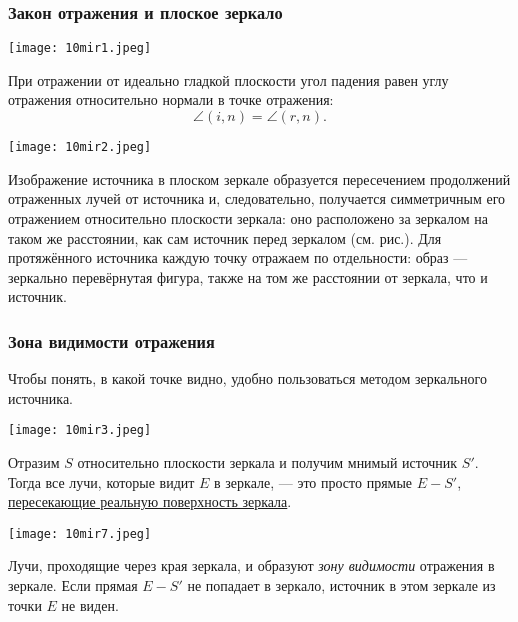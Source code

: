 \documentclass[12pt, a4paper]{article}%
\begin{document}
\subsubsection*{Закон отражения и плоское зеркало}

\begin{center}
\texttt{[image: 10mir1.jpeg]}
\label{fig:mpr}
\end{center}

При отражении от идеально гладкой плоскости угол падения равен углу отражения относительно нормали в точке отражения:
\[
\angle(i,n)=\angle(r,n).
\]

\begin{center}
\texttt{[image: 10mir2.jpeg]}
\label{fig:mpr}
\end{center}

Изображение источника в плоском зеркале образуется пересечением продолжений отраженных лучей от источника и, следовательно, получается симметричным его отражением относительно плоскости зеркала: оно расположено за зеркалом на таком же расстоянии, как сам источник перед зеркалом (см. рис.). Для протяжённого источника каждую точку отражаем по отдельности: образ — зеркально перевёрнутая фигура, также на том же расстоянии от зеркала, что и источник.

\subsubsection*{Зона видимости отражения}
Чтобы понять, в какой точке видно, удобно пользоваться методом зеркального источника.

\begin{center}
\texttt{[image: 10mir3.jpeg]}
\label{fig:mpr}
\end{center}

Отразим $S$ относительно плоскости зеркала и получим мнимый источник $S'$. Тогда все лучи, которые видит $E$ в зеркале, — это просто прямые $E\!-\!S'$, \underline{пересекающие реальную поверхность зеркала}.

\begin{center}
\texttt{[image: 10mir7.jpeg]}
\label{fig:mpr}
\end{center}

Лучи, проходящие через края зеркала, и образуют \textit{зону видимости} отражения в зеркале. Если прямая $E\!-\!S'$ не попадает в зеркало, источник в этом зеркале из точки $E$ не виден.
\end{document}
